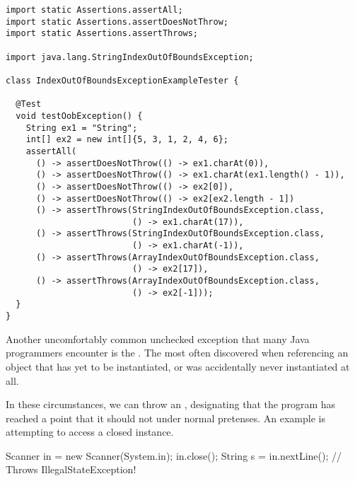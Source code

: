 \begin{lstlisting}[language=MyJava]
import static Assertions.assertAll;
import static Assertions.assertDoesNotThrow;
import static Assertions.assertThrows;

import java.lang.StringIndexOutOfBoundsException;

class IndexOutOfBoundsExceptionExampleTester {

  @Test
  void testOobException() {
    String ex1 = "String";
    int[] ex2 = new int[]{5, 3, 1, 2, 4, 6}; 
    assertAll(
      () -> assertDoesNotThrow(() -> ex1.charAt(0)),
      () -> assertDoesNotThrow(() -> ex1.charAt(ex1.length() - 1)),
      () -> assertDoesNotThrow(() -> ex2[0]),
      () -> assertDoesNotThrow(() -> ex2[ex2.length - 1])
      () -> assertThrows(StringIndexOutOfBoundsException.class, 
                         () -> ex1.charAt(17)),
      () -> assertThrows(StringIndexOutOfBoundsException.class, 
                         () -> ex1.charAt(-1)),
      () -> assertThrows(ArrayIndexOutOfBoundsException.class,  
                         () -> ex2[17]),
      () -> assertThrows(ArrayIndexOutOfBoundsException.class, 
                         () -> ex2[-1]));
  } 
}
\end{lstlisting} 

Another uncomfortably common unchecked exception that many Java programmers encounter is the . 
The  most often discovered when referencing an object that has yet to be instantiated, or was accidentally never instantiated at all.


In these circumstances, we can throw an , designating that the program has reached a point that it should not under normal pretenses. 
An example is attempting to access a closed  instance.
\begin{verbnobox}[\small]
Scanner in = new Scanner(System.in);
in.close();
String s = in.nextLine(); // Throws IllegalStateException!
\end{verbnobox}
